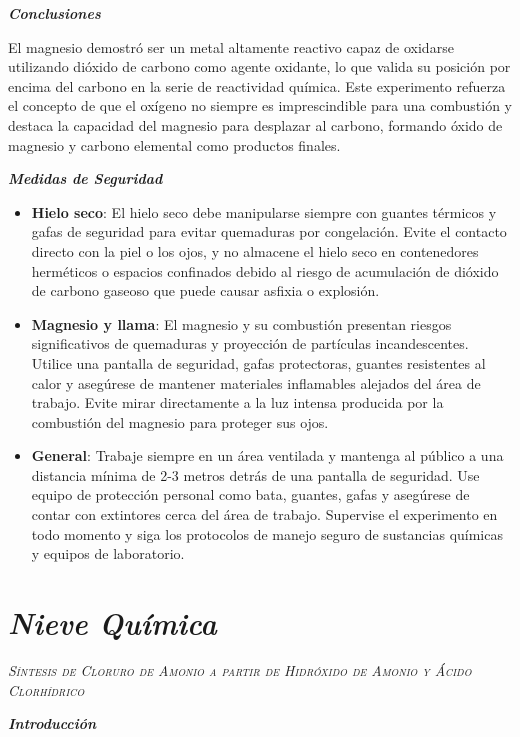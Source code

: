     \textit{\textbf{Conclusiones }} 
    
    El magnesio demostró ser un metal altamente reactivo capaz de oxidarse utilizando dióxido de carbono como agente oxidante, lo que valida su posición por encima del carbono en la serie de reactividad química. Este experimento refuerza el concepto de que el oxígeno no siempre es imprescindible para una combustión y destaca la capacidad del magnesio para desplazar al carbono, formando óxido de magnesio y carbono elemental como productos finales.
    
    \textit{\textbf{Medidas de Seguridad }} 
    \begin{itemize}
        \item \textbf{Hielo seco}: El hielo seco debe manipularse siempre con guantes térmicos y gafas de seguridad para evitar quemaduras por congelación. Evite el contacto directo con la piel o los ojos, y no almacene el hielo seco en contenedores herméticos o espacios confinados debido al riesgo de acumulación de dióxido de carbono gaseoso que puede causar asfixia o explosión.

        \item \textbf{Magnesio y llama}: El magnesio y su combustión presentan riesgos significativos de quemaduras y proyección de partículas incandescentes. Utilice una pantalla de seguridad, gafas protectoras, guantes resistentes al calor y asegúrese de mantener materiales inflamables alejados del área de trabajo. Evite mirar directamente a la luz intensa producida por la combustión del magnesio para proteger sus ojos.

        \item \textbf{General}: Trabaje siempre en un área ventilada y mantenga al público a una distancia mínima de 2-3 metros detrás de una pantalla de seguridad. Use equipo de protección personal como bata, guantes, gafas y asegúrese de contar con extintores cerca del área de trabajo. Supervise el experimento en todo momento y siga los protocolos de manejo seguro de sustancias químicas y equipos de laboratorio.
    \end{itemize}
    \newpage
\section{\textit{\textbf{Nieve Química}}} 
\textit{\textsc{Síntesis de Cloruro de Amonio a partir de Hidróxido de Amonio y Ácido Clorhídrico}}

    \textit{\textbf{Introducción }} 
    
